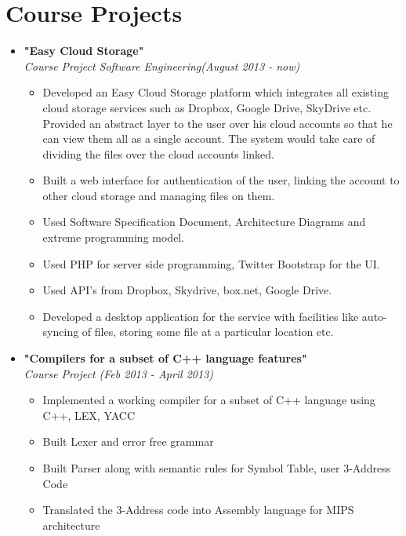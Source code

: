 \documentclass[margin,line]{resume}
\begin{document}
\begin{resume}
\begin{itemize}
  \end{itemize}

  \section{\mysidestyle Course Projects}

  \begin{itemize}

  \item \large{\textbf{\textsf{"Easy Cloud Storage"}}}
    \\ \small{\textit{Course Project Software Engineering(August 2013 - now)}}
    \normalsize
    \begin{itemize}
    \item Developed an Easy Cloud Storage platform which integrates all existing cloud storage services such as Dropbox, Google Drive, SkyDrive etc. Provided an abstract layer to the user over his cloud accounts so that he can view them all as a single account. The system would take care of dividing the files over the cloud accounts linked.
    \item Built a web interface for authentication of the user, linking the account to other cloud storage and managing files on them.
    \item Used Software Specification Document, Architecture Diagrams and extreme programming model.
    \item Used PHP for server side programming, Twitter Bootstrap for the UI.
    \item Used API's from Dropbox, Skydrive, box.net, Google Drive.
    \item Developed a desktop application for the service with facilities like auto-syncing of files, storing some file at a particular location etc.
    \end{itemize}

  \item \large{\textbf{\textsf{"Compilers for a subset of C++ language features"}}}
    \\ \small{\textit{Course Project (Feb 2013 - April 2013)}}
    \normalsize
    \begin{itemize}
    \item Implemented a working compiler for a subset of C++ language using C++, LEX, YACC
    \item Built Lexer and error free grammar
    \item Built Parser along with semantic rules for Symbol Table, user 3-Address Code
    \item Translated the 3-Address code into Assembly language for MIPS architecture
    \end{itemize}


\end{itemize}
\end{resume}
\end{document}
